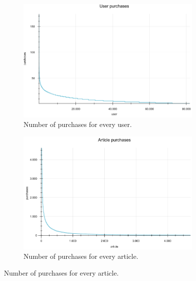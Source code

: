 \documentclass[10pt]{reportMaster}
\begin{document}
\begin{figure}
	\begin{subfigure}[c]{1\textwidth}
		\centering
		\includegraphics[width=1\textwidth]{figures/experiments/userPurchases}
		\caption{Number of purchases for every user.}
		\label{fig:userPurchases}
	\end{subfigure}
	\begin{subfigure}[c]{1\textwidth}
		\centering
		\includegraphics[width=1\textwidth]{figures/experiments/articlePurchases}
		\caption{Number of purchases for every article.}
		\label{fig:articlePurchases}
	\end{subfigure}
\end{figure}
\end{document}
